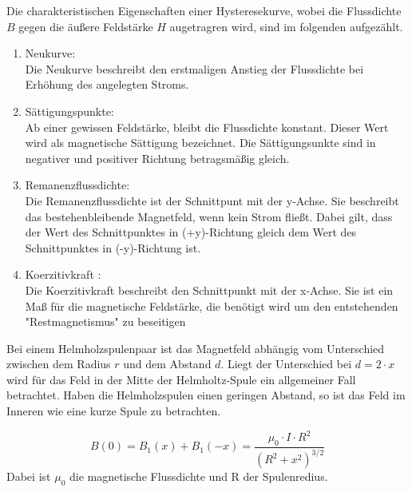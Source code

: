 Die charakteristischen Eigenschaften einer Hysteresekurve,
wobei die Flussdichte $B$ gegen die äußere Feldstärke $H$ augetragren wird, sind im folgenden aufgezählt.
\begin{enumerate}
  \item Neukurve:\\
  Die Neukurve beschreibt den erstmaligen Anstieg der Flussdichte bei Erhöhung des angelegten Stroms.
  \item Sättigungspunkte:\\
  Ab einer gewissen Feldstärke, bleibt die Flussdichte konstant.
  Dieser Wert wird als magnetische Sättigung bezeichnet.
  Die Sättigungsunkte sind in negativer und positiver Richtung betragsmäßig gleich.
  \item Remanenzflussdichte:\\
  Die Remanenzflussdichte ist der Schnittpunt mit der y-Achse.
  Sie beschreibt das bestehenbleibende Magnetfeld, wenn kein Strom fließt.
  Dabei gilt, dass der Wert des Schnittpunktes in (+y)-Richtung gleich dem Wert des Schnittpunktes in (-y)-Richtung ist.
  \item Koerzitivkraft :\\
  Die Koerzitivkraft beschreibt den Schnittpunkt mit der x-Achse.
  Sie ist ein Maß für die magnetische Feldstärke,
  die benötigt wird um den entstehenden "Restmagnetismus" zu beseitigen\cite{on3}
\end{enumerate}
Bei einem Helmholzspulenpaar ist das Magnetfeld abhängig vom Unterschied zwischen dem Radius $r$
und dem Abstand $d$. Liegt der Unterschied bei $d=2\cdot x$ wird für das Feld in der Mitte der
Helmholtz-Spule ein allgemeiner Fall betrachtet.
Haben die Helmholzspulen einen geringen Abstand, so ist das Feld im Inneren wie eine kurze Spule zu betrachten.

\begin{equation}
  B(0) = B_1(x) + B_1(-x) = \frac{\mu_0\cdot I\cdot R^2}{(R^2+x^2)^{3/2}}
  \label{eqn:3}
\end{equation}
Dabei ist $\mu_0$ die magnetische Flussdichte und R der Spulenredius.
